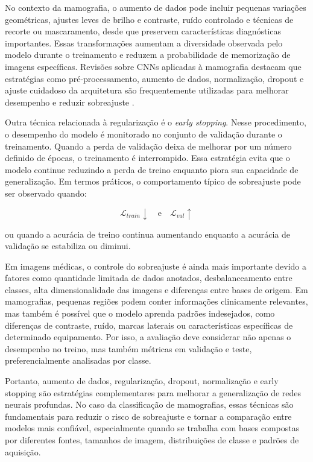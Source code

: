 \documentclass[
    12pt,
    openright,
    oneside,
    a4paper,
    english,
    brazil
]{abntex2}
\begin{document}
No contexto da mamografia, o aumento de dados pode incluir pequenas variações geométricas, ajustes leves de brilho e contraste, ruído controlado e técnicas de recorte ou mascaramento, desde que preservem características diagnósticas importantes. Essas transformações aumentam a diversidade observada pelo modelo durante o treinamento e reduzem a probabilidade de memorização de imagens específicas. Revisões sobre CNNs aplicadas à mamografia destacam que estratégias como pré-processamento, aumento de dados, normalização, dropout e ajuste cuidadoso da arquitetura são frequentemente utilizadas para melhorar desempenho e reduzir sobreajuste \cite{abdelhafiz2019deep}.

Outra técnica relacionada à regularização é o \textit{early stopping}. Nesse procedimento, o desempenho do modelo é monitorado no conjunto de validação durante o treinamento. Quando a perda de validação deixa de melhorar por um número definido de épocas, o treinamento é interrompido. Essa estratégia evita que o modelo continue reduzindo a perda de treino enquanto piora sua capacidade de generalização. Em termos práticos, o comportamento típico de sobreajuste pode ser observado quando:

\[
\mathcal{L}_{train} \downarrow
\quad \text{e} \quad
\mathcal{L}_{val} \uparrow
\]

ou quando a acurácia de treino continua aumentando enquanto a acurácia de validação se estabiliza ou diminui.

Em imagens médicas, o controle do sobreajuste é ainda mais importante devido a fatores como quantidade limitada de dados anotados, desbalanceamento entre classes, alta dimensionalidade das imagens e diferenças entre bases de origem. Em mamografias, pequenas regiões podem conter informações clinicamente relevantes, mas também é possível que o modelo aprenda padrões indesejados, como diferenças de contraste, ruído, marcas laterais ou características específicas de determinado equipamento. Por isso, a avaliação deve considerar não apenas o desempenho no treino, mas também métricas em validação e teste, preferencialmente analisadas por classe.

Portanto, aumento de dados, regularização, dropout, normalização e early stopping são estratégias complementares para melhorar a generalização de redes neurais profundas. No caso da classificação de mamografias, essas técnicas são fundamentais para reduzir o risco de sobreajuste e tornar a comparação entre modelos mais confiável, especialmente quando se trabalha com bases compostas por diferentes fontes, tamanhos de imagem, distribuições de classe e padrões de aquisição.
\end{document}
